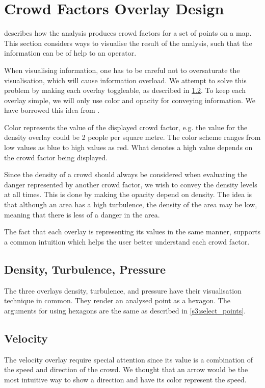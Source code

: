 \section{Crowd Factors Overlay Design} \label{sec:s4_overlay}

 describes how the analysis produces crowd factors for a set of points on a map. This section considers ways to visualise the result of the analysis, such that the information can be of help to an operator.

When visualising information, one has to be careful not to oversaturate the visualisation, which will cause information overload. We attempt to solve this problem by making each overlay toggleable, as described in \cref{}. To keep each overlay simple, we will only use color and opacity for conveying information. We have borrowed this idea from \citep{}.

Color represents the value of the displayed crowd factor, e.g. the value for the density overlay could be 2 people per square metre. The color scheme ranges from low values as blue to high values as red. What denotes a high value depends on the crowd factor being displayed.

Since the density of a crowd should always be considered when evaluating the danger represented by another crowd factor, we wish to convey the density levels at all times. This is done by making the opacity depend on density. The idea is that although an area has a high turbulence, the density of the area may be low, meaning that there is less of a danger in the area.

The fact that each overlay is representing its values in the same manner, supports a common intuition which helps the user better understand each crowd factor.

\subsection{Density, Turbulence, Pressure}
The three overlays density, turbulence, and pressure have their visualisation technique in common. They render an analysed point as a hexagon. The arguments for using hexagons are the same as described in \cref{s3:select_points}.

\subsection{Velocity}
The velocity overlay require special attention since its value is a combination of the speed and direction of the crowd. We thought that an arrow would be the most intuitive way to show a direction and have its color represent the speed.


